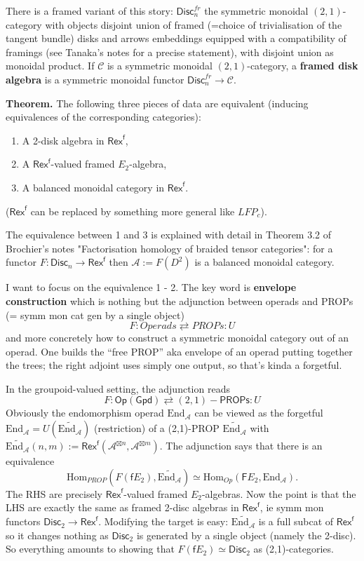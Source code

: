 \documentclass[11pt]{article}
\newcommand{\C}{\mathcal{C}}
\newcommand{\Rexf}{\mathsf{Rex}^{\mathsf{f}}}
\newcommand{\cA}{\mathcal{A}}
\theoremstyle{definition}
\begin{document}
There is a framed variant of this story:  $\mathsf{Disc}_n^{fr}$  the symmetric monoidal $(2,1)$-category with objects disjoint union of framed (=choice of trivialisation of the tangent bundle)  disks and arrows  embeddings equipped with a compatibility of framings (see Tanaka's notes for a precise statement), with disjoint union as monoidal product. If $\C$ is a symmetric monoidal $(2,1)$-category, a \textbf{framed disk algebra} is a symmetric monoidal functor $\mathsf{Disc}_n^{fr} \to \C$.\medskip


\noindent \textbf{Theorem.} The following three pieces of data are equivalent (inducing equivalences of the corresponding categories):
\begin{enumerate}
    \item A 2-disk algebra in $\Rexf$,
    \item A $\Rexf$-valued framed $E_2$-algebra,
    \item A balanced monoidal category in $\Rexf$.
\end{enumerate}
($\Rexf$ can be replaced by something more general like $LFP_c$).

The equivalence between 1 and 3 is explained with detail in Theorem 3.2 of Brochier's notes "Factorisation homology of braided tensor categories": for a functor $F: \mathsf{Disc}_n \to \Rexf$ then $\cA:=F(D^2)$ is a balanced monoidal category.

I want to focus on the equivalence 1 - 2. The key word is \textbf{envelope construction} which is nothing but the adjunction between operads and PROPs (= symm mon cat gen by a single object)
$$F: Operads \rightleftarrows PROPs :U$$
and more concretely how to construct a symmetric monoidal category out of an operad. One builds the ``free PROP'' aka envelope of an operad putting together the trees; the right adjoint uses simply one output, so that's kinda a forgetful.

In the groupoid-valued setting, the adjunction reads
$$  F: \mathsf{Op}(\mathsf{Gpd})  \rightleftarrows  (2,1)-\mathsf{PROPs} :U $$
Obviously the endomorphism operad $\text{End}_\cA$ can be viewed as the forgetful $\text{End}_\cA=U(\widetilde{\text{End}_\cA})$ (restriction) of a (2,1)-PROP $\widetilde{\text{End}_\cA}$ with  $\widetilde{\text{End}_\cA}(n,m):= \Rexf(\cA^{\boxtimes n}, \cA^{\boxtimes m})$. The adjunction says that there is an equivalence
$$ \text{Hom}_{PROP}(F(\mathsf{f}E_2),\widetilde{\text{End}_\cA} ) \simeq \text{Hom}_{Op}(\mathsf{F} E_2,\text{End}_\cA ) .$$
The RHS are precisely $\Rexf$-valued framed $E_2$-algebras. Now the point is that the LHS are exactly the same as framed 2-disc algebras in $\Rexf$, ie symm mon functors $\mathsf{Disc}_2 \to \Rexf$. Modifying the target is easy: $\widetilde{\text{End}_\cA}$ is a full subcat of $\Rexf$ so it changes nothing as $\mathsf{Disc}_2$ is generated by a single object (namely the 2-disc). So everything amounts to showing that $F(\mathsf{f}E_2) \simeq \mathsf{Disc}_2 $ as (2,1)-categories.
\end{document}
